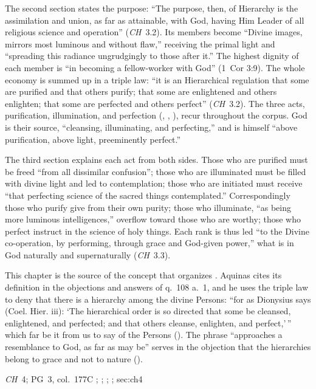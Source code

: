 The second section states the purpose: ``The purpose, then, of Hierarchy
is the assimilation and union, as far as attainable, with God, having Him
Leader of all religious science and operation'' (\emph{CH}~3.2). Its
members become ``Divine images, mirrors most luminous and without flaw,''
receiving the primal light and ``spreading this radiance ungrudgingly to
those after it.'' The highest dignity of each member is ``in becoming a
fellow-worker with God'' (1~Cor 3:9). The whole economy is summed up in
a triple law: ``it is an Hierarchical regulation that some are purified
and that others purify; that some are enlightened and others enlighten;
that some are perfected and others perfect'' (\emph{CH}~3.2). The three
acts, purification, illumination, and perfection (,
, ), recur throughout the corpus. God is
their source, ``cleansing, illuminating, and perfecting,'' and is himself
``above purification, above light, preeminently perfect.''

The third section explains each act from both sides. Those who are
purified must be freed ``from all dissimilar confusion''; those who are
illuminated must be filled with divine light and led to contemplation;
those who are initiated must receive ``that perfecting science of the
sacred things contemplated.'' Correspondingly those who purify give from
their own purity; those who illuminate, ``as being more luminous
intelligences,'' overflow toward those who are worthy; those who perfect
instruct in the science of holy things. Each rank is thus led ``to the
Divine co-operation, by performing, through grace and God-given power,''
what is in God naturally and supernaturally (\emph{CH}~3.3).

This chapter is the source of the concept that organizes . Aquinas cites its definition in the objections and
answers of q.~108 a.~1, and he uses the triple law to deny that there is
a hierarchy among the divine Persons: ``for as Dionysius says (Coel.
Hier. iii): `The hierarchical order is so directed that some be cleansed,
enlightened, and perfected; and that others cleanse, enlighten, and
perfect,'\,'' which far be it from us to say of the Persons (). The phrase ``approaches a resemblance to God, as far as may
be'' serves in the objection that the hierarchies belong to grace and not
to nature ().

{\emph{CH}~4; PG~3, col.~177C}
{; ; ; ; }{sec:ch4}

